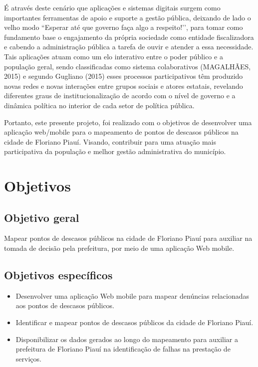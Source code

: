 \documentclass[12pt]{article}
\begin{document}
É através deste cenário que aplicações e sistemas digitais surgem como importantes ferramentas de apoio e suporte a gestão pública, deixando de lado o velho modo “Esperar até que governo faça algo a respeito!’’, para tomar como fundamento base o engajamento da própria sociedade como entidade fiscalizadora e cabendo a administração pública a tarefa de ouvir e atender a essa necessidade. Tais aplicações atuam como um elo interativo entre o poder público e a população geral, sendo classificadas como sistema colaborativos (MAGALHÃES, 2015) e segundo Gugliano (2015) esses processos participativos têm produzido novas redes e novas interações entre grupos sociais e atores estatais, revelando diferentes graus de institucionalização de acordo com o nível de governo e a dinâmica política no interior de cada setor de política pública.

Portanto, este presente projeto, foi realizado com o objetivos de desenvolver uma aplicação web/mobile para o mapeamento de pontos de descasos públicos na cidade de Floriano Piauí. Visando, contribuir para uma atuação mais participativa da população e melhor gestão administrativa do município.

\section{Objetivos}
\subsection{Objetivo geral}
Mapear pontos de descasos públicos na cidade de Floriano Piauí para auxiliar na tomada de decisão pela prefeitura, por meio de uma aplicação Web mobile.
\subsection{Objetivos específicos}
\begin{itemize}
\item Desenvolver uma aplicação Web mobile para mapear denúncias relacionadas aos pontos de descasos públicos.
\item Identificar e mapear pontos de descasos públicos da cidade de Floriano Piauí.
\item Disponibilizar os dados gerados ao longo do mapeamento para auxiliar a\\ prefeitura de Floriano Piauí na identificação de falhas na prestação de serviços.
\end{itemize}
\end{document}
